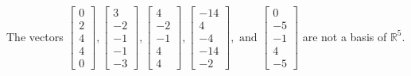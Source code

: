 \begin{exercise}
\begin{exerciseStatement}
  \end{exerciseStatement}
  \begin{exerciseAnswer}
   The vectors \(\left[\begin{array}{r}
0 \\
2 \\
4 \\
4 \\
0
\end{array}\right] , \left[\begin{array}{r}
3 \\
-2 \\
-1 \\
-1 \\
-3
\end{array}\right] , \left[\begin{array}{r}
4 \\
-2 \\
-1 \\
4 \\
4
\end{array}\right] , \left[\begin{array}{r}
-14 \\
4 \\
-4 \\
-14 \\
-2
\end{array}\right] , \text{ and } \left[\begin{array}{r}
0 \\
-5 \\
-1 \\
4 \\
-5
\end{array}\right]\) 
  	 are not  a basis of \(\mathbb{R}^5\).
  


  \end{exerciseAnswer}
\end{exercise}